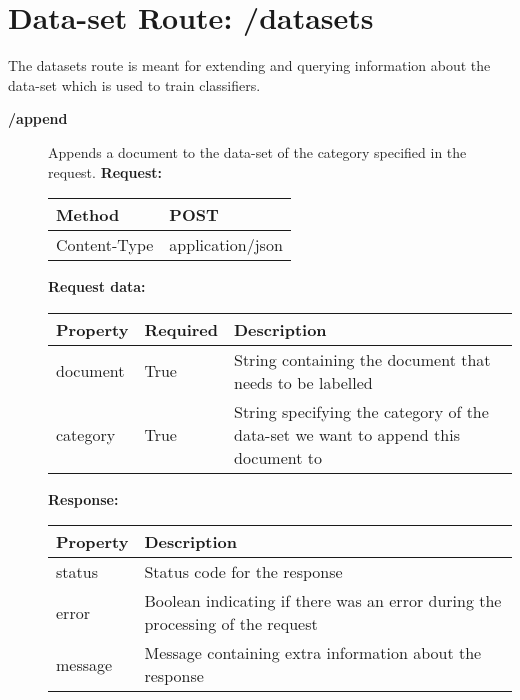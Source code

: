 \section{Data-set Route: /datasets}
The datasets route is meant for extending and querying information about the data-set which is used to train classifiers. 

\begin{description}


\item [{\large \textbf{/append}}]
Appends a document to the data-set of the category specified in the request.
\newline
\newline
\textbf{Request:}
\newline
\newline
\begin{tabular}{ | l | l |}
\hline
Method & POST\\ \hline
Content-Type & application/json\\ \hline
\end{tabular}
\newline
\newline
\textbf{Request data:}
\newline
\newline
\resizebox{\textwidth}{!} {
\begin{tabular}{ | l | l | l |}
\hline
\textbf{Property} & \textbf{Required} & \textbf{Description}\\ \hline
document & True & String containing the document that needs to be labelled\\ \hline
category & True & String specifying the category of the data-set we want to append this document to\\ \hline
\end{tabular}}
\newline
\newline
\textbf{Response:}
\newline
\newline
\resizebox{\textwidth}{!} {
\begin{tabular}{ | l | l |}
\hline
\textbf{Property} & \textbf{Description}\\ \hline
status & Status code for the response\\ \hline
error & Boolean indicating if there was an error during the processing of the request\\ \hline
message & Message containing extra information about the response\\ \hline
\end{tabular}}



\end{description}
